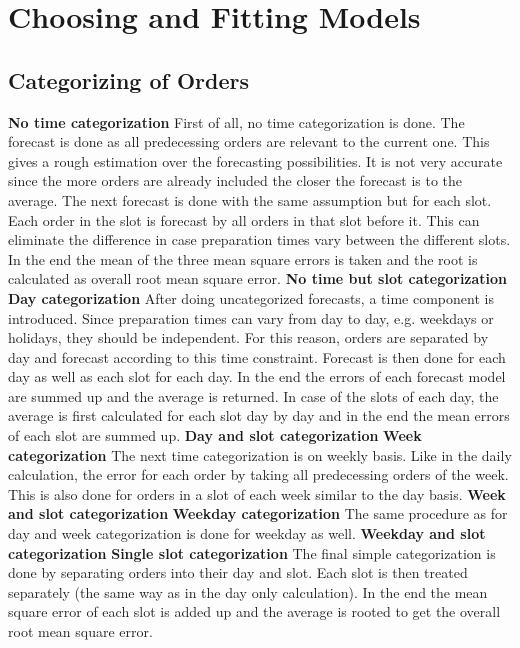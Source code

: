 \section{Choosing and Fitting Models}\label{section:Preliminary Analysis}
\subsection{Categorizing of Orders}\label{subsection:Categorizing by Order}
\textbf{No time categorization}
First of all, no time categorization is done. The forecast is done as all predecessing orders are relevant to the current one. This gives a rough estimation over the forecasting possibilities. It is not very accurate since the more orders are already included the closer the forecast is to the average. The next forecast is done with the same assumption but for each slot. Each order in the slot is forecast by all orders in that slot before it. This can eliminate the difference in case preparation times vary between the different slots. In the end the mean of the three mean square errors is taken and the root is calculated as overall root mean square error.
\textbf{No time but slot categorization}
\textbf{Day categorization}
After doing uncategorized forecasts, a time component is introduced. Since preparation times can vary from day to day, e.g. weekdays or holidays, they should be independent. For this reason, orders are separated by day and forecast according to this time constraint. Forecast is then done for each day as well as each slot for each day. In the end the errors of each forecast model are summed up and the average is returned. In case of the slots of each day, the average is first calculated for each slot day by day and in the end the mean errors of each slot are summed up.
\textbf{Day and slot categorization}
\textbf{Week categorization}
The next time categorization is on weekly basis. Like in the daily calculation, the error for each order by taking all predecessing orders of the week. This is also done for orders in a slot of each week similar to the day basis.
\textbf{Week and slot categorization}
\textbf{Weekday categorization}
The same procedure as for day and week categorization is done for weekday as well.
\textbf{Weekday and slot categorization}
\textbf{Single slot categorization}
The final simple categorization is done by separating orders into their day and slot. Each slot is then treated separately (the same way as in the day only calculation). In the end the mean square error of each slot is added up and the average is rooted to get the overall root mean square error.\newline

